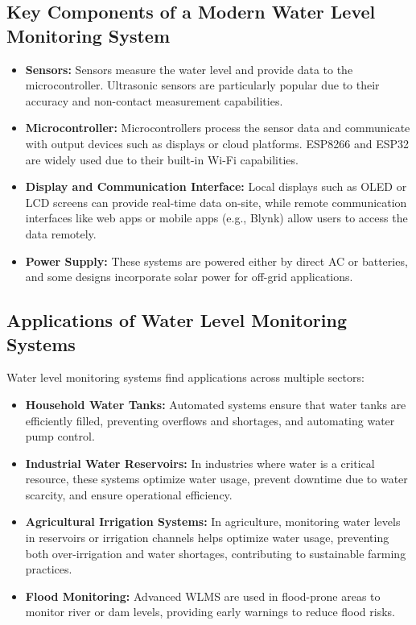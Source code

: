 {    \subsection{Key Components of a Modern Water Level Monitoring System}
    \begin{itemize}
      \item \textbf{Sensors:} Sensors measure the water level and provide data to the microcontroller. Ultrasonic sensors are particularly popular due to their accuracy and non-contact measurement capabilities. 
      \item \textbf{Microcontroller:} Microcontrollers process the sensor data and communicate with output devices such as displays or cloud platforms. ESP8266 and ESP32 are widely used due to their built-in Wi-Fi capabilities. 
      \item \textbf{Display and Communication Interface:} Local displays such as OLED or LCD screens can provide real-time data on-site, while remote communication interfaces like web apps or mobile apps (e.g., Blynk) allow users to access the data remotely. 
      \item \textbf{Power Supply:} These systems are powered either by direct AC or batteries, and some designs incorporate solar power for off-grid applications. 
    \end{itemize}
    
    \subsection{Applications of Water Level Monitoring Systems}
    Water level monitoring systems find applications across multiple sectors:
    \begin{itemize}
      \item \textbf{Household Water Tanks:} Automated systems ensure that water tanks are efficiently filled, preventing overflows and shortages, and automating water pump control.
      \item \textbf{Industrial Water Reservoirs:} In industries where water is a critical resource, these systems optimize water usage, prevent downtime due to water scarcity, and ensure operational efficiency. 
      \item \textbf{Agricultural Irrigation Systems:} In agriculture, monitoring water levels in reservoirs or irrigation channels helps optimize water usage, preventing both over-irrigation and water shortages, contributing to sustainable farming practices.
      \item \textbf{Flood Monitoring:} Advanced WLMS are used in flood-prone areas to monitor river or dam levels, providing early warnings to reduce flood risks. 
    \end{itemize}
    
}
